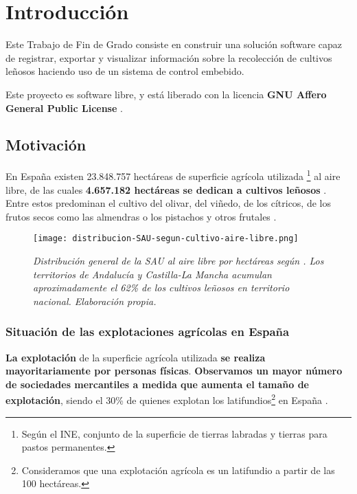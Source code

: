 \chapter{Introducción}

Este Trabajo de Fin de Grado consiste en construir una solución software
capaz de registrar, exportar y visualizar información sobre la recolección de cultivos
leñosos haciendo uso de un sistema de control embebido.

Este proyecto es software libre, y está liberado con
la licencia \textbf{GNU Affero General Public License} \cite{agplv3}.

\section{Motivación}

En España existen 23.848.757 hectáreas de superficie agrícola utilizada%
\footnote{%
Según el INE, conjunto de la superficie de tierras labradas y tierras
para pastos permanentes.
}%
al aire libre, de las cuales \textbf{4.657.182 hectáreas se dedican a cultivos leñosos}
 \cite{INEdistribucionDeLaSuperficiePorTamaño}.
Entre estos predominan el cultivo del olivar, del viñedo, de los cítricos,
de los frutos secos como las almendras o los pistachos y otros frutales
 \cite{INEpanoramicaCensoAgrario}.

\begin{figure}[!b]
    \centering
    \texttt{[image: distribucion-SAU-segun-cultivo-aire-libre.png]}
    \caption{\textit{Distribución general de la SAU al aire libre por hectáreas
    según \cite{INEdistribucionDeLaSuperficiePorTamaño}. Los territorios de Andalucía y Castilla-La Mancha
    acumulan aproximadamente el 62\% de los cultivos leñosos en territorio nacional.
    Elaboración propia.}}
\end{figure}

\subsection{Situación de las explotaciones agrícolas en España}

\textbf{La explotación} de la superficie agrícola utilizada \textbf{se realiza mayoritariamente por personas
físicas}. \textbf{Observamos un mayor número de sociedades mercantiles
a medida que aumenta el tamaño de explotación}, siendo el 30\% de quienes explotan los latifundios\footnote{%
    Consideramos que una explotación agrícola es un latifundio a partir de las 100 hectáreas.
}%
 en España
 \cite[Personalidad jurídica según el tamaño de explotación]{INEpanoramicaCensoAgrario}.

